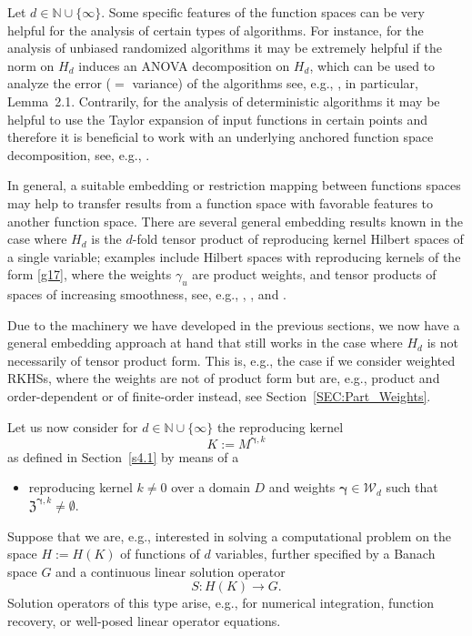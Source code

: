 \documentclass{article}
\newcommand{\N}  {{\mathbb N}}
\newcommand{\bg}{{\boldsymbol{\gamma}}}
\newcommand{\Z}{{\mathfrak Z}}
\newcommand{\W}  {\mathcal{W}}
\theoremstyle{plain}
\theoremstyle{definition}
\begin{document}
Let $d \in \N \cup \{\infty\}$.
Some specific features of the function spaces can be very helpful 
for the analysis of certain types of algorithms. For instance, for 
the analysis of unbiased randomized algorithms it may be extremely 
helpful if the norm on $H_d$ induces an ANOVA
decomposition on $H_d$, which can be used to analyze 
the error ($=$ variance) of the algorithms see, e.g., \citet{BG14}, 
in particular, Lemma~2.1. Contrarily, for the analysis of 
deterministic algorithms it may be helpful to use the Taylor 
expansion of input functions in certain points and therefore 
it is beneficial to work with an underlying anchored function space 
decomposition, see, e.g., \citet[Section~5.3]{DG12}.

In general, a suitable embedding or restriction mapping between
functions spaces may help to transfer results from 
a function space with favorable features to another
function space.
There are several general embedding results known in the case where 
$H_d$ is the $d$-fold tensor product of 
reproducing kernel Hilbert spaces of a single variable;
examples include Hilbert spaces with reproducing
kernels of the form \eqref{g17},
where the weights $\gamma_u$ are product weights,
and tensor products of
spaces of increasing smoothness, see, 
e.g., \citet{HR13}, \citet{GHHR17}, and \citet{GHHRW2019}.

Due to the machinery we have developed in the previous 
sections, we now have a general embedding approach at hand that 
still works in the case where $H_d$ is not necessarily of tensor 
product form. This is, e.g., the case if we consider weighted RKHSs, 
where the weights are not of product form but are, e.g., product 
and order-dependent or 
of finite-order instead, see Section~\ref{SEC:Part_Weights}. 

Let us now consider for $d\in \N \cup \{\infty\}$ the reproducing 
kernel 
\[
K := M^{\bg,k}
\]
as defined in Section~\ref{s4.1} by means of a
\begin{itemize}
\item[(B1)]
reproducing kernel 
$k \neq 0$ over a domain $D$
and weights $\bg \in \W_d$ such that
$\Z^{\bg,k} \neq \emptyset$.
\end{itemize}
\noindent
Suppose that we are, e.g., interested in solving a computational problem 
on the space $H := H(K)$ of functions of $d$ variables, 
further specified by a Banach space $G$ and a continuous 
linear solution operator 
\[
S \colon H(K) \to G.
\]
Solution operators 
of this type arise, e.g., for numerical integration,
function recovery, or well-posed linear operator equations.
\end{document}
